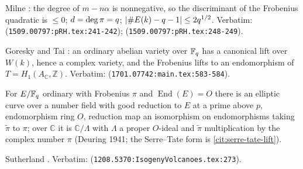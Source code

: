 \begin{citedfact}[Degree is a nonnegative quadratic form; $\deg\pi = \qs$; Hasse's bound]
\label{cit:hasse-degree-bound}
Milne \cite{milne2015rh}: the degree of $m-n\alpha$ is nonnegative, so the discriminant of the %
Frobenius quadratic is $\le0$; $d = \deg\pi = q$; $|\#E(k)-q-1|\le2q^{1/2}$.
Verbatim: \texttt{}
(\texttt{1509.00797:pRH.tex:241-242}); \texttt{}
(\texttt{1509.00797:pRH.tex:248-249}).
\end{citedfact}

\begin{citedfact}
\label{cit:serre-tate-lift}
Goresky and Tai \cite{goreskytai2017ordinary}: an ordinary abelian variety over $\mathbb F_q$ has a
canonical lift over $W(k)$, hence a complex variety, and the Frobenius lifts to an
endomorphism of $T = H_1(A_{\mathbb C},\mathbb Z)$.
Verbatim: \texttt{} (\texttt{1701.07742:main.tex:583-584}).
\end{citedfact}

\begin{assumption}
\label{asm:deuring-lift}
For $E/\mathbb F_q$ ordinary with Frobenius $\pi$ and $\operatorname{End}(E) = O$ there is an elliptic
curve over a number field with good reduction to $E$ at a prime above $p$, endomorphism ring
$O$, reduction map an isomorphism on endomorphisms taking $\tilde\pi$ to $\pi$; over $\mathbb C$
it is $\mathbb C/\Lambda$ with $\Lambda$ a proper $O$-ideal and $\tilde\pi$ multiplication by the %
complex number $\pi$ (Deuring 1941; the Serre--Tate form is \cref{cit:serre-tate-lift}).
\end{assumption}

\begin{citedfact}
\label{cit:degree-norm-index}
Sutherland \cite{sutherland2012volcanoes}.
Verbatim: \texttt{} (\texttt{1208.5370:IsogenyVolcanoes.tex:273}).
\end{citedfact}

